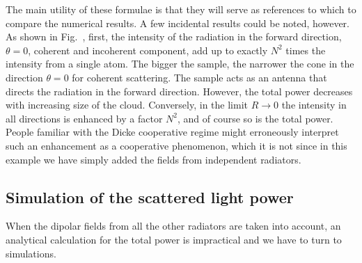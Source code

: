 The main utility of these formulae is that they will serve as references to which to compare the numerical results. A few incidental results could be noted, however. As shown in Fig.~, first, the intensity of the radiation in the forward direction, $\theta=0$, coherent and incoherent component, add up to exactly $N^2$ times the intensity from a single atom. The bigger the sample, the narrower the cone in the direction $\theta=0$ for coherent scattering. The sample acts as an antenna that directs the radiation in the forward direction. However, the total power decreases with increasing size of the cloud. Conversely, in the limit $R\rightarrow0$ the intensity in all directions is enhanced by a factor $N^2$, and of course so is the total power. People familiar with the Dicke cooperative regime might erroneously interpret such an enhancement as a cooperative phenomenon, which it is not since in this example we have simply added the fields from independent radiators.


\subsection{Simulation of the scattered light power} 

When the dipolar fields from all the other radiators are taken into account, an analytical calculation for the total power is impractical and we have to turn to simulations. 


